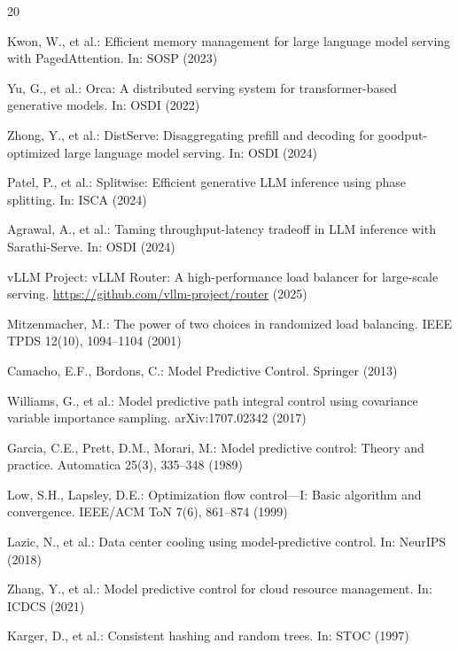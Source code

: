 \documentclass[runningheads]{llncs}
\begin{document}

\begin{thebibliography}{20}

Kwon, W., et al.: Efficient memory management for large language model serving with PagedAttention. In: SOSP (2023)

Yu, G., et al.: Orca: A distributed serving system for transformer-based generative models. In: OSDI (2022)

Zhong, Y., et al.: DistServe: Disaggregating prefill and decoding for goodput-optimized large language model serving. In: OSDI (2024)

Patel, P., et al.: Splitwise: Efficient generative LLM inference using phase splitting. In: ISCA (2024)

Agrawal, A., et al.: Taming throughput-latency tradeoff in LLM inference with Sarathi-Serve. In: OSDI (2024)

vLLM Project: vLLM Router: A high-performance load balancer for large-scale serving. \url{https://github.com/vllm-project/router} (2025)

Mitzenmacher, M.: The power of two choices in randomized load balancing. IEEE TPDS 12(10), 1094--1104 (2001)

Camacho, E.F., Bordons, C.: Model Predictive Control. Springer (2013)

Williams, G., et al.: Model predictive path integral control using covariance variable importance sampling. arXiv:1707.02342 (2017)

Garcia, C.E., Prett, D.M., Morari, M.: Model predictive control: Theory and practice. Automatica 25(3), 335--348 (1989)

Low, S.H., Lapsley, D.E.: Optimization flow control---I: Basic algorithm and convergence. IEEE/ACM ToN 7(6), 861--874 (1999)

Lazic, N., et al.: Data center cooling using model-predictive control. In: NeurIPS (2018)

Zhang, Y., et al.: Model predictive control for cloud resource management. In: ICDCS (2021)

Karger, D., et al.: Consistent hashing and random trees. In: STOC (1997)


\end{thebibliography}
\end{document}
